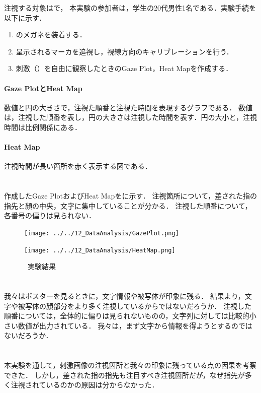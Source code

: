注視する対象はで，
本実験の参加者は，学生の20代男性1名である．実験手続を以下に示す．
\begin{enumerate}
    \renewcommand{\labelenumi}{\fbox{\theenumi}}
    \item \tobi のメガネを装着する．
    \item 呈示されるマーカを追視し，視線方向のキャリブレーションを行う．
    \item 刺激（）を自由に観察したときのGaze Plot，Heat Mapを作成する．
\end{enumerate}
\paragraph{Gaze PlotとHeat Map}
数値と円の大きさで，注視た順番と注視た時間を表現するグラフである．
数値は，注視した順番を表し，円の大きさは注視した時間を表す．円の大小と，注視時間は比例関係にある．
\paragraph{Heat Map}
注視時間が長い箇所を赤く表示する図である．
\clearpage
\section{\result}
作成したGaze PlotおよびHeat Mapをに示す．
注視箇所について，差された指の指先と顔の中央，文字に集中していることが分かる．
注視した順番について，各番号の偏りは見られない．
\begin{figure}[H]
    \centering
    \begin{minipage}[b]{.48\textwidth}
        \centering
        \texttt{[image: ../../12\_DataAnalysis/GazePlot.png]}
    \end{minipage}
    \begin{minipage}[b]{.48\textwidth}
        \centering
        \texttt{[image: ../../12\_DataAnalysis/HeatMap.png]}
    \end{minipage}
    \caption{\kadaid \ 実験結果}
    \label{fig:実験結果\kadaid}
\end{figure}
\section{\consideration}
我々はポスターを見るときに，文字情報や被写体が印象に残る．
結果より，文字や被写体の顔部分をより多く注視しているからではないだろうか．
注視した順番については，全体的に偏りは見られないものの，文字列に対しては比較的小さい数値が出力されている．
我々は，まず文字から情報を得ようとするのではないだろうか．
\section{\conclusion}
本実験を通して，刺激画像の注視箇所と我々の印象に残っている点の因果を考察できた．
しかし，差された指の指先も注目すべき注視箇所だが，なぜ指先が多く注視されているのかの原因は分からなかった．